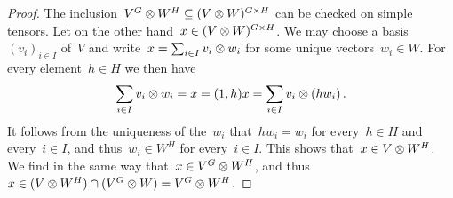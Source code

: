 \documentclass[a4paper,11pt]{scrartcl}
\begin{document}
\begin{proof}
  The inclusion~$V^G \otimes W^H \subseteq (V \otimes W)^{G \times H}$ can be checked on simple tensors.
  Let on the other hand~$x \in (V \otimes W)^{G \times H}$.
  We may choose a basis~$(v_i)_{i \in I}$ of~$V$ and write~$x = \sum_{i \in I} v_i \otimes w_i$ for some unique vectors~$w_i \in W$.
  For every element~$h \in H$ we then have
  \[
    \sum_{i \in I} v_i \otimes w_i
    =
    x
    =
    (1,h) x
    =
    \sum_{i \in I} v_i \otimes (h w_i) \,.
  \]
  It follows from the uniqueness of the~$w_i$ that~$h w_i = w_i$ for every~$h \in H$ and every~$i \in I$, and thus~$w_i \in W^H$ for every~$i \in I$.
  This shows that~$x \in V \otimes W^H$.
  We find in the same way that~$x \in V^G \otimes W^H$, and thus~$x \in (V \otimes W^H) \cap (V^G \otimes W) = V^G \otimes W^H$.
\end{proof}





\printbibliography
\end{document}
